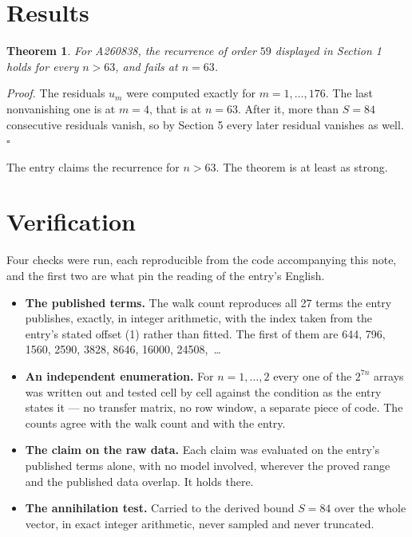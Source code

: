 \documentclass[11pt]{article}
\newtheorem{theorem}{Theorem}
\theoremstyle{definition}
\begin{document}
\section{Results}

\begin{theorem} For A260838, the recurrence of order $59$ displayed in Section 1 holds for every $n > 63$, and fails at $n = 63$.\end{theorem}

{\itshape Proof.} The residuals $u_m$ were computed exactly for $m = 1,\dots,176$. The last nonvanishing one is at $m = 4$, that is at $n = 63$. After it, more than $S = 84$ consecutive residuals vanish, so by Section 5 every later residual vanishes as well. $\square$

The entry claims the recurrence for $n > 63$. The theorem is at least as strong.

\section{Verification}

Four checks were run, each reproducible from the code accompanying this note, and the first two are what pin the reading of the entry's English.

\begin{itemize}

\item {\bfseries The published terms.} The walk count reproduces all 27 terms the entry publishes, exactly, in integer arithmetic, with the index taken from the entry's stated offset (1) rather than fitted. The first of them are 644, 796, 1560, 2590, 3828, 8646, 16000, 24508,~\dots

\item {\bfseries An independent enumeration.} For $n = 1,\dots,2$ every one of the $2^{7n}$ arrays was written out and tested cell by cell against the condition as the entry states it --- no transfer matrix, no row window, a separate piece of code. The counts agree with the walk count and with the entry.

\item {\bfseries The claim on the raw data.} Each claim was evaluated on the entry's published terms alone, with no model involved, wherever the proved range and the published data overlap. It holds there.

\item {\bfseries The annihilation test.} Carried to the derived bound $S = 84$ over the whole vector, in exact integer arithmetic, never sampled and never truncated.

\end{itemize}
\end{document}
